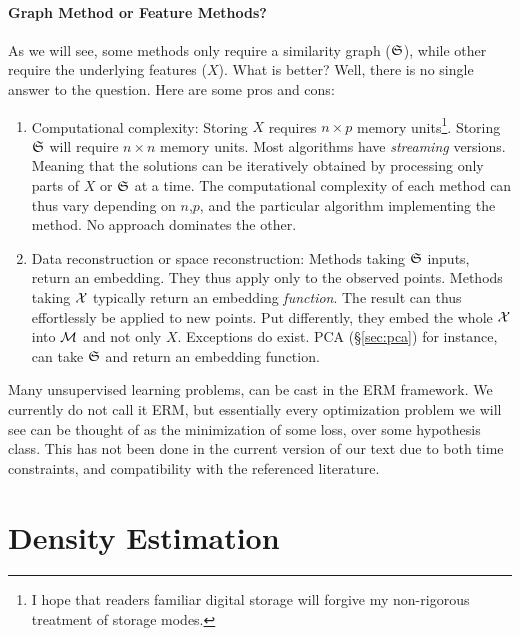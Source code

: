 \paragraph{Graph Method or Feature Methods?}
As we will see, some methods only require a similarity graph ($\mathfrak{S}$), while other require the underlying features ($X$).
What is better?
Well, there is no single answer to the question.
Here are some pros and cons:
\begin{enumerate}
\item Computational complexity: 
Storing $X$ requires $n \times p$ memory units\footnote{ I hope that readers familiar digital storage will forgive my non-rigorous treatment of storage modes.}.
Storing $\mathfrak{S}$ will require $n \times n$ memory units.
Most algorithms have \emph{streaming} versions. Meaning that the solutions can be iteratively obtained by processing only parts of $X$ or $\mathfrak{S}$ at a time. 
The computational complexity of each method can thus vary depending on $n$,$p$, and the particular algorithm implementing the method. 
No approach dominates the other.

\item Data reconstruction or space reconstruction:
Methods taking $\mathfrak{S}$ inputs, return an embedding. They thus apply only to the observed points.
Methods taking $\mathcal{X}$ typically return an embedding \emph{function}. The result can thus effortlessly be applied to new points. Put differently, they embed the whole $\mathcal{X}$ into $\mathcal{M}$ and not only $X$. 
Exceptions do exist. PCA (\S\ref{sec:pca}) for instance, can take $\mathfrak{S}$ and return an embedding function.
\end{enumerate}





\begin{remark}
Many unsupervised learning problems, can be cast in the ERM framework.
We currently do not call it ERM, but essentially every optimization problem we will see can be thought of as the minimization of some loss, over some hypothesis class.
This has not been done in the current version of our text due to both time constraints, and compatibility with the referenced literature.
\end{remark}




\section{Density Estimation}
\label{sec:density_estimation}

